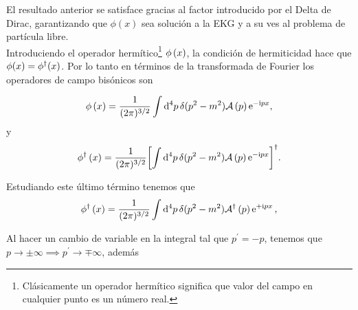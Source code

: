 
El resultado anterior se satisface gracias al factor introducido por el Delta de Dirac, garantizando que $\phi \left(x\right)$ sea solución a la EKG y a su ves al problema de partícula libre.\\

Introduciendo el operador hermítico\footnote{Clásicamente un operador hermítico significa que valor del campo en cualquier punto es un número real.} $\phi \left(x\right) $, la condición de hermiticidad hace que  $\phi(x)=\phi^{\dagger}(x)$. Por lo tanto en términos de la transformada de Fourier los operadores de campo bisónicos son

\begin{equation}
    \phi \left(x\right) =\frac{1}{(2\pi)^{3/2}}\int \dd[4]{p} \delta (p^{2}-m^{2}) \mathcal{A} \left(p\right) \mathrm{e}^{-\mathrm{i} px}, 
    \label{eq_3.21}
\end{equation}
y 
\begin{equation}
    \phi^{\dagger}\left(x\right) =\frac{1}{(2\pi)^{3/2}}\qty\bigg[\int \dd[4]{p} \delta (p^{2}-m^{2}) \mathcal{A} \left(p\right) \mathrm{e}^{-\mathrm{i} px}]^{\dagger}. 
    \label{eq_3.22}
\end{equation}

Estudiando este último término tenemos que 
\begin{equation*}
    \phi^{\dagger}\left(x\right) =\frac{1}{(2\pi)^{3/2}} \int \dd[4]{p} \delta (p^{2}-m^{2}) \mathcal{A}^{\dagger} \left(p\right) \mathrm{e}^{+\mathrm{i} px} \, ,
\end{equation*}

Al hacer un cambio de variable en la integral tal que $p^{\prime}=-p$, tenemos que $p \to \pm\infty \implies p^{\prime} \to \mp \infty$, además

